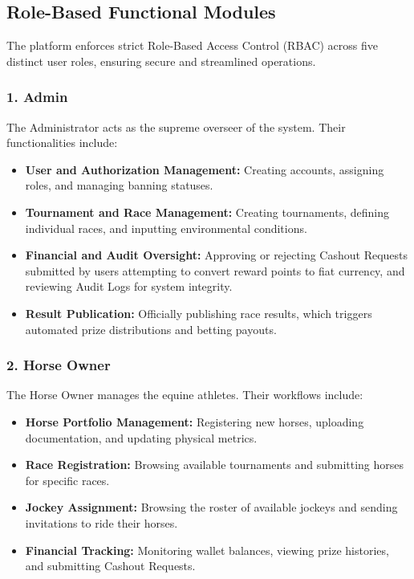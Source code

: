 \documentclass{llncs}
\begin{document}
\subsection{Role-Based Functional Modules}
The platform enforces strict Role-Based Access Control (RBAC) across five distinct user roles, ensuring secure and streamlined operations.

\subsubsection{1. Admin}
The Administrator acts as the supreme overseer of the system. Their functionalities include:
\begin{itemize}
    \item \textbf{User and Authorization Management:} Creating accounts, assigning roles, and managing banning statuses.
    \item \textbf{Tournament and Race Management:} Creating tournaments, defining individual races, and inputting environmental conditions.
    \item \textbf{Financial and Audit Oversight:} Approving or rejecting Cashout Requests submitted by users attempting to convert reward points to fiat currency, and reviewing Audit Logs for system integrity.
    \item \textbf{Result Publication:} Officially publishing race results, which triggers automated prize distributions and betting payouts.
\end{itemize}

\subsubsection{2. Horse Owner}
The Horse Owner manages the equine athletes. Their workflows include:
\begin{itemize}
    \item \textbf{Horse Portfolio Management:} Registering new horses, uploading documentation, and updating physical metrics.
    \item \textbf{Race Registration:} Browsing available tournaments and submitting horses for specific races.
    \item \textbf{Jockey Assignment:} Browsing the roster of available jockeys and sending invitations to ride their horses.
    \item \textbf{Financial Tracking:} Monitoring wallet balances, viewing prize histories, and submitting Cashout Requests.
\end{itemize}
\end{document}
